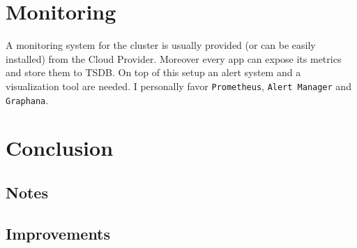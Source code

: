 \documentclass[a4paper,10pt]{article}
\begin{document}
\section{Monitoring}
A monitoring system for the cluster is usually provided (or can be easily installed) from the Cloud Provider. Moreover every app can expose its metrics and store them to TSDB. On top of this setup an alert system and a visualization tool are needed. I personally favor 
\texttt{Prometheus}, \texttt{Alert Manager} and \texttt{Graphana}.

\section{Conclusion}
\subsection{Notes}
\subsection{Improvements}
\end{document}
